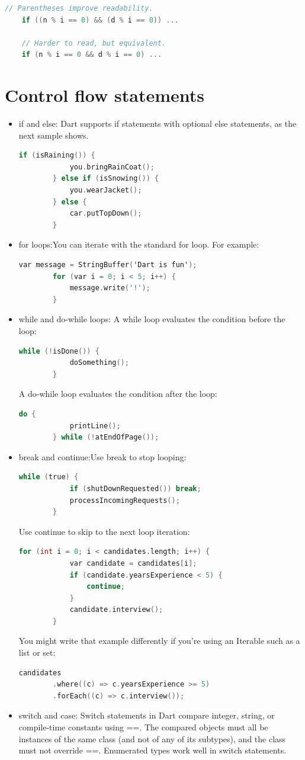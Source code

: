 \begin{lstlisting}[language=C]
	// Parentheses improve readability.
	if ((n % i == 0) && (d % i == 0)) ...
	
	// Harder to read, but equivalent.
	if (n % i == 0 && d % i == 0) ...
\end{lstlisting}
\section{Control flow statements}
\begin{itemize}
	\item if and else: Dart supports if statements with optional else statements, as the next sample shows. 
	\begin{lstlisting}[language=C]
		if (isRaining()) {
			you.bringRainCoat();
		} else if (isSnowing()) {
			you.wearJacket();
		} else {
			car.putTopDown();
		}
	\end{lstlisting}
	\item for loops:You can iterate with the standard for loop. For example:
	\begin{lstlisting}[language=C]
		var message = StringBuffer('Dart is fun');
		for (var i = 0; i < 5; i++) {
			message.write('!');
		}
	\end{lstlisting}
	\item while and do-while loops: A while loop evaluates the condition before the loop:
	\begin{lstlisting}[language=C]
		while (!isDone()) {
			doSomething();
		}
	\end{lstlisting}
	A do-while loop evaluates the condition after the loop:
	\begin{lstlisting}[language=C]
		do {
			printLine();
		} while (!atEndOfPage());
	\end{lstlisting}


	\item break and continue:Use break to stop looping:
	
	\begin{lstlisting}[language=C]
		while (true) {
			if (shutDownRequested()) break;
			processIncomingRequests();
		}
	\end{lstlisting}
	Use continue to skip to the next loop iteration:
	\begin{lstlisting}[language=C]
		for (int i = 0; i < candidates.length; i++) {
			var candidate = candidates[i];
			if (candidate.yearsExperience < 5) {
				continue;
			}
			candidate.interview();
		}
	\end{lstlisting}
	You might write that example differently if you're using an Iterable such as a list or set:
	\begin{lstlisting}[language=C]
		candidates
		.where((c) => c.yearsExperience >= 5)
		.forEach((c) => c.interview());
	\end{lstlisting}
	\item switch and case: Switch statements in Dart compare integer, string, or compile-time constants using ==. The compared objects must all be instances of the same class (and not of any of its subtypes), and the class must not override ==. Enumerated types work well in switch statements.
	

\end{itemize}
